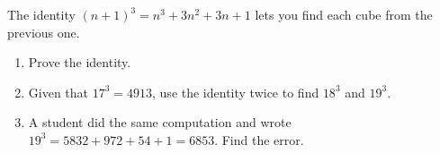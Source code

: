 The identity $(n+1)^3=n^3+3n^2+3n+1$ lets you find each cube from the previous one.
\begin{enumerate}
\item[(a)] Prove the identity.
\item[(b)] Given that $17^3=4913$, use the identity twice to find $18^3$ and $19^3$.
\item[(c)] A student did the same computation and wrote $19^3=5832+972+54+1=6853$. Find the error.
\end{enumerate}
